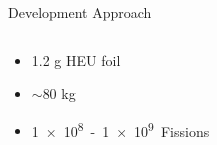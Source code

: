 \documentclass[xcolor=x11names,compress]{beamer}
\renewcommand{\(}{\begin{columns}}
\renewcommand{\)}{\end{columns}}
\newcommand{\<}[1]{\begin{column}{#1}}
\renewcommand{\>}{\end{column}}
\begin{document}
\begin{frame}{Development Approach}
  \begin{columns}
    \begin{column}{0.55\linewidth}
      \begin{itemize}
        \item 1.2 g HEU foil
        \item $\sim80$ kg
        \item \SI{1e+8} - \SI{1e+9} Fissions
      \end{itemize}  
      
      \renewcommand*{\thesubfigure}{}
      \begin{figure}[htp]
        \centering
        \subcapcentertrue
        \vspace{-0.6cm}
      \end{figure}
    \end{column}
    
    \begin{column}{0.5\linewidth}
      \vspace{-1cm}      
      \renewcommand*{\thesubfigure}{}
      \begin{figure}[htp]
        \centering
        \subcapcentertrue
      \end{figure}
      

\end{column}
\end{columns}
\end{frame}
\end{document}

